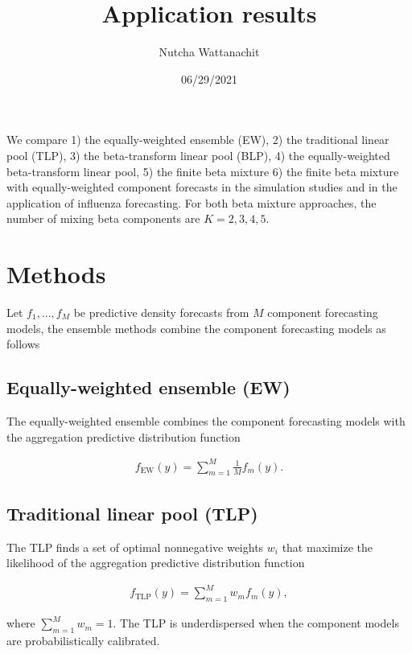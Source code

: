 \documentclass[
]{article}
\title{Application results}
\author{Nutcha Wattanachit}
\date{06/29/2021}
\begin{document}
\maketitle

We compare 1) the equally-weighted ensemble (EW), 2) the traditional
linear pool (TLP), 3) the beta-transform linear pool (BLP), 4) the
equally-weighted beta-transform linear pool, 5) the finite beta mixture
6) the finite beta mixture with equally-weighted component forecasts in
the simulation studies and in the application of influenza forecasting.
For both beta mixture approaches, the number of mixing beta components
are \(K=2,3,4,5\).

\hypertarget{methods}{%
\section{Methods}\label{methods}}

Let \(f_1,...,f_M\) be predictive density forecasts from \(M\) component
forecasting models, the ensemble methods combine the component
forecasting models as follows

\hypertarget{equally-weighted-ensemble-ew}{%
\subsection{Equally-weighted ensemble
(EW)}\label{equally-weighted-ensemble-ew}}

The equally-weighted ensemble combines the component forecasting models
with the aggregation predictive distribution function

\begin{align}
f_{\text{EW}}(y)=\sum_{m=1}^M \frac{1}{M}f_m(y).
\end{align}

\hypertarget{traditional-linear-pool-tlp}{%
\subsection{Traditional linear pool
(TLP)}\label{traditional-linear-pool-tlp}}

The TLP finds a set of optimal nonnegative weights \(w_i\) that maximize
the likelihood of the aggregation predictive distribution function

\begin{align}
f_{\text{TLP}}(y)=\sum_{m=1}^M w_mf_m(y),
\end{align}

where \(\sum_{m=1}^M w_m=1\). The TLP is underdispersed when the
component models are probabilistically calibrated.
\end{document}
